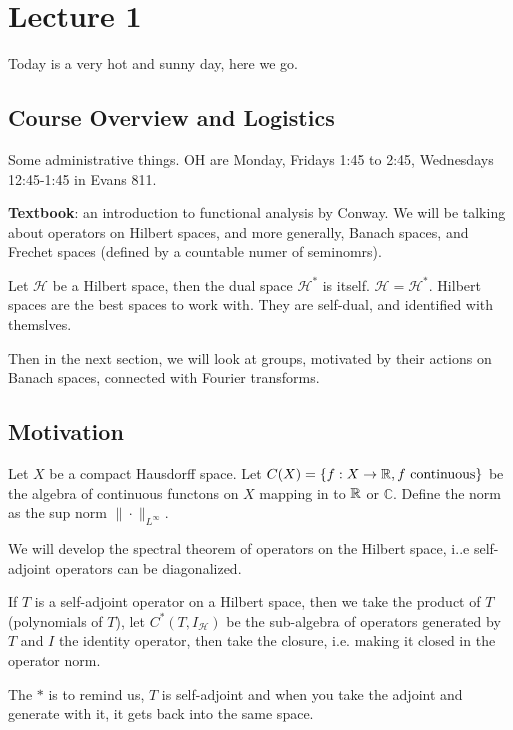 \section{Lecture 1}
Today is a very hot and sunny day, here we go.

\subsection{Course Overview and Logistics}
Some administrative things.
OH are Monday, Fridays 1:45 to 2:45, Wednesdays 12:45-1:45 in Evans 811.

\textbf{Textbook}: an introduction to functional analysis by Conway.
We will be talking about operators on Hilbert spaces, and more generally, Banach spaces, and Frechet spaces (defined by a countable numer of seminomrs).

\begin{remark}
    Let $\mathcal{H}$ be a Hilbert space, then the dual space $\mathcal{H}^*$ is itself. $\mathcal{H}=\mathcal{H}^*$.    
    Hilbert spaces are the best spaces to work with. They are self-dual, and identified with themslves.
\end{remark}
Then in the next section, we will look at groups, motivated by their actions on Banach spaces, connected with Fourier transforms. 


\subsection{Motivation}
Let $X$ be a compact Hausdorff space. Let $C(X)=\{f:X\to\mathbb{R}, f \text{ continuous}\} $ be the algebra of continuous functons on $X$ mapping in to $\mathbb{R}$ or $\mathbb{C}$.
Define the norm as the sup norm $\|\cdot\|_{L^\infty}$.

We will develop the spectral theorem of operators on the Hilbert space, i..e self-adjoint operators can be diagonalized.

If $T$ is a self-adjoint operator on a Hilbert space, then we take the product of $T$ (polynomials of $T$), let $C^*(T, I_\mathcal{H})$ be the sub-algebra of operators generated by $T$ and $I$ the identity operator, then take the closure, i.e. making it closed in the operator norm.

\begin{remark}
    The $*$ is to remind us, $T$ is self-adjoint and when you take the adjoint and generate with it, it gets back into the same space.
\end{remark}

